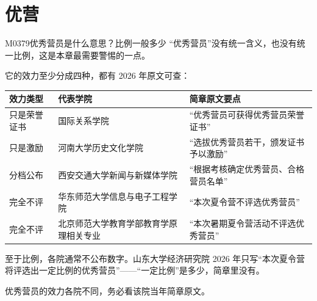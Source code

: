 \section{优营}
\begin{qa}{M0379}{优秀营员是什么意思？比例一般多少}
“优秀营员”没有统一含义，也没有统一比例，这是本章最需要警惕的一点。

它的效力至少分成四种，都有 2026 年原文可查：
\par\vspace{2pt}\nobreak\begin{center}\footnotesize
\begin{tabularx}{\textwidth}{>{\raggedright\arraybackslash}X>{\raggedright\arraybackslash}X>{\raggedright\arraybackslash}X}
\toprule
\textbf{效力类型} & \textbf{代表学院} & \textbf{简章原文要点} \\ \midrule
只是荣誉证书 & 国际关系学院 & “优秀营员可获得优秀营员荣誉证书” \\
只是激励 & 河南大学历史文化学院 & “选拔优秀营员若干，颁发证书予以激励” \\
分档公布 & 西安交通大学新闻与新媒体学院 & “根据考核确定优秀营员、合格营员名单” \\
完全不评 & 华东师范大学信息与电子工程学院 & “本次夏令营不评选优秀营员” \\
完全不评 & 北京师范大学教育学部教育学原理相关专业 & “本次暑期夏令营活动不评选优秀营员” \\
\bottomrule
\end{tabularx}
\end{center}\vspace{2pt}\par

至于比例，各院通常不公布数字。山东大学经济研究院 2026 年只写“本次夏令营将评选出一定比例的优秀营员”——“一定比例”是多少，简章里没有。

优秀营员的效力各院不同，务必看该院当年简章原文。
\end{qa}

